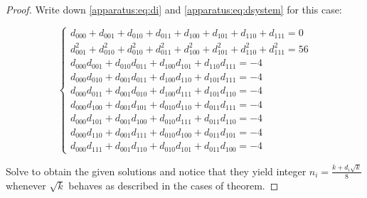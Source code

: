     \begin{proof}
        Write down \eqref{apparatus:eq:di} and \eqref{apparatus:eq:dsystem} for this case:
        
        \begin{equation}
            \begin{cases}
                d_{000} + d_{001} + d_{010} + d_{011} + d_{100}  + d_{101}  + d_{110}  + d_{111} = 0 \\
                d_{001}^2 + d_{010}^2 + d_{010}^2 + d_{011}^2 + d_{100}^2 + d_{101}^2 + d_{110}^2 + d_{111}^2 = 56 \\
                d_{000} d_{001} + d_{010} d_{011} + d_{100} d_{101} +  d_{110} d_{111} = -4 \\
                d_{000} d_{010} + d_{001} d_{011} + d_{100} d_{110} +  d_{101} d_{111} = -4 \\
                d_{000} d_{011} + d_{001} d_{010} + d_{100} d_{111} +  d_{101} d_{110} = -4 \\
                d_{000} d_{100} + d_{001} d_{101} + d_{010} d_{110} +  d_{011} d_{111} = -4 \\
                d_{000} d_{101} +  d_{001} d_{100} + d_{010} d_{111} + d_{011} d_{110} = -4 \\
                d_{000} d_{110} + d_{001} d_{111} + d_{010} d_{100} + d_{011} d_{101} = -4 \\
                d_{000} d_{111} + d_{001} d_{110} + d_{010} d_{101} +  d_{011} d_{100} = -4
            \end{cases}
        \end{equation}
        
        Solve to obtain the given solutions and notice that they yield integer $n_i = \frac{k+d_i \sqrt k}8$ whenever $\sqrt k$ behaves as described in the cases of theorem.
    \end{proof}
